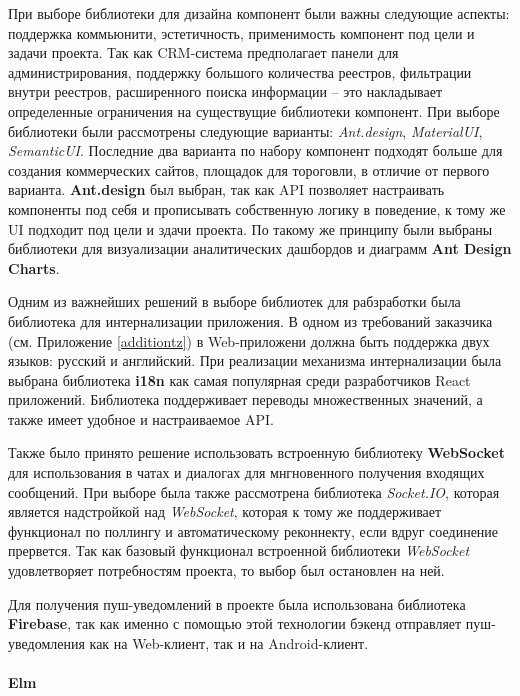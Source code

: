 \documentclass[a4paper,12pt,reqno]{article}
\begin{document}
При выборе библиотеки для дизайна компонент были важны следующие аспекты: поддержка коммьюнити, эстетичность, применимость компонент под цели и задачи проекта. Так как CRM-система предполагает панели для администрирования, поддержку большого количества реестров, фильтрации внутри реестров, расширенного поиска информации -- это накладывает определенные ограничения на существущие библиотеки компонент. При выборе библиотеки были рассмотрены следующие варианты: \textit{Ant.design}, \textit{MaterialUI}, \textit{SemanticUI}. Последние два варианта по набору компонент подходят больше для создания коммерческих сайтов, площадок для тороговли, в отличие от первого варианта. \textbf{Ant.design} был выбран, так как API позволяет настраивать компоненты под себя и прописывать собственную логику в поведение, к тому же UI подходит под цели и здачи проекта. По такому же принципу были выбраны библиотеки для визуализации аналитических дашбордов и диаграмм \textbf{Ant Design Charts}.

Одним из важнейших решений в выборе библиотек для рабзработки была библиотека для интернализации приложения. В одном из требований заказчика (см. Приложение \ref{additiontz}) в Web-приложени должна быть поддержка двух языков: русский и английский. При реализации механизма интернализации была выбрана библиотека \textbf{i18n} как самая популярная среди разработчиков React приложений. Библиотека поддерживает переводы множественных значений, а также имеет удобное и настраиваемое API.  

Также было принято решение использовать встроенную библиотеку \textbf{WebSocket} для использования в чатах и диалогах для мнгновенного получения входящих сообщений. При выборе была также рассмотрена библиотека \textit{Socket.IO}, которая является надстройкой над \textit{WebSocket}, которая к тому же поддерживает функционал по поллингу и автоматическому реконнекту, если вдруг соединение прервется. Так как базовый функционал встроенной библиотеки \textit{WebSocket} удовлетворяет потребностям проекта, то выбор был остановлен на ней.

Для получения пуш-уведомлений в проекте была использована библиотека \textbf{Firebase}, так как именно с помощью этой технологии бэкенд отправляет пуш-уведомления как на Web-клиент, так и на Android-клиент. 

\paragraph*{Elm\\}
\end{document}
